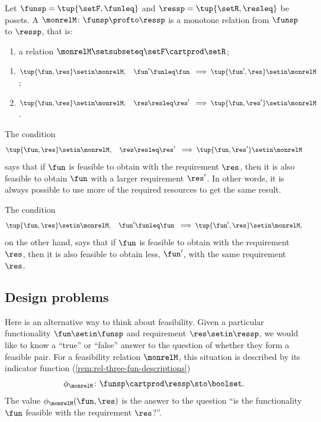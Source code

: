 \begin{ctdefinition}
    \label{def:feasibility-relation}
    Let $\funsp = \tup{\setF, \funleq}$ and $\ressp = \tup{\setR, \resleq}$ be posets.
    A  $\monrelM \colon \funsp \profto \ressp$ is a monotone relation from $\funsp$ to $\ressp$, that is:

    \constit
    \begin{enumerate}
        \item a relation $\monrelM \setsubseteq \setF \cartprod \setR$;
    \end{enumerate}
    \condit
    \begin{enumerate}
        \item $\tup{\fun, \res} \setin \monrelM, \quad \fun' \funleq \fun \ \implies \tup{\fun', \res} \setin \monrelM$;
        \item $\tup{\fun, \res} \setin \monrelM, \quad \res \resleq \res' \ \implies \tup{\fun, \res'} \setin \monrelM$.
    \end{enumerate}
\end{ctdefinition}

The condition
\begin{equation}\label{eq:mon-rel-cond-1}
    \tup{\fun, \res} \setin \monrelM, \quad \res \resleq \res' \ \implies \tup{\fun, \res'} \setin \monrelM
\end{equation}
says that if $\fun$ is feasible to obtain with the requirement $\res$, then it is also feasible to obtain $\fun$ with a larger requirement $\res'$.
In other words, it is always possible to use more of the required resources to get the same result.

The condition
\begin{equation}\label{eq:mon-rel-cond-2}
    \tup{\fun, \res} \setin \monrelM, \quad \fun' \funleq \fun \ \implies \tup{\fun', \res} \setin \monrelM,
\end{equation}
on the other hand, says that if $\fun$ is feasible to obtain with the requirement $\res$, then it is also feasible to obtain less, $\fun'$, with the same requirement $\res$.


\subsection[Design problems]{Design problems}
\label{sec:dpdefinition}

Here is an alternative way to think about feasibility.
Given a particular functionality $\fun \setin \funsp$ and requirement $\res \setin \ressp$, we would like to know a ``true'' or ``false'' answer to the question of whether they form a feasible pair.
For a feasibility relation $\monrelM$, this situation is described by its indicator function (\cref{rem:rel-three-fun-descriptions})
%
\begin{equation}
    \phi_\monrelM \colon \funsp \cartprod \ressp \sto \boolset.
\end{equation}
%
The value $\phi_\monrelM(\fun, \res)$ is the answer to the question ``is the functionality $\fun$ feasible with the requirement $\res$?''.


